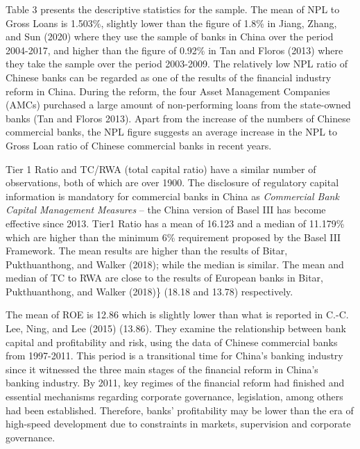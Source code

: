 \documentclass{article}
\begin{document}
Table 3 presents the descriptive statistics for the sample. The mean of
NPL to Gross Loans is 1.503\%, slightly lower than the figure of 1.8\%
in Jiang, Zhang, and Sun (2020) where they use the sample of banks in
China over the period 2004-2017, and higher than the figure of 0.92\% in
Tan and Floros (2013) where they take the sample over the period
2003-2009. The relatively low NPL ratio of Chinese banks can be regarded
as one of the results of the financial industry reform in China. During
the reform, the four Asset Management Companies (AMCs) purchased a large
amount of non-performing loans from the state-owned banks (Tan and
Floros 2013). Apart from the increase of the numbers of Chinese
commercial banks, the NPL figure suggests an average increase in the NPL
to Gross Loan ratio of Chinese commercial banks in recent years.

Tier 1 Ratio and TC/RWA (total capital ratio) have a similar number of
observations, both of which are over 1900. The disclosure of regulatory
capital information is mandatory for commercial banks in China as
\emph{Commercial Bank Capital Management Measures} -- the China version
of Basel III has become effective since 2013. Tier1 Ratio has a mean of
16.123 and a median of 11.179\% which are higher than the minimum 6\%
requirement proposed by the Basel III Framework. The mean results are
higher than the results of Bitar, Pukthuanthong, and Walker (2018);
while the median is similar. The mean and median of TC to RWA are close
to the results of European banks in Bitar, Pukthuanthong, and Walker
(2018)\} (18.18 and 13.78) respectively.

The mean of ROE is 12.86 which is slightly lower than what is reported
in C.-C. Lee, Ning, and Lee (2015) (13.86). They examine the
relationship between bank capital and profitability and risk, using the
data of Chinese commercial banks from 1997-2011. This period is a
transitional time for China's banking industry since it witnessed the
three main stages of the financial reform in China's banking industry.
By 2011, key regimes of the financial reform had finished and essential
mechanisms regarding corporate governance, legislation, among others had
been established. Therefore, banks' profitability may be lower than the
era of high-speed development due to constraints in markets, supervision
and corporate governance.
\end{document}
